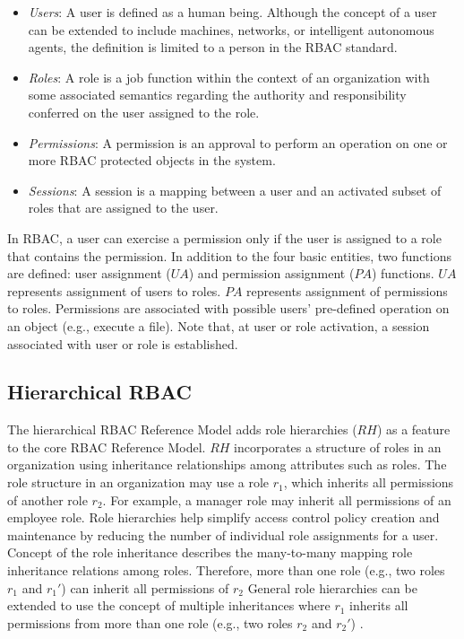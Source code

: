 \begin{itemize}
\setlength{\itemsep}{0.25pt}
\item \emph{Users}: A user is defined as a human being. Although the concept of a user can be extended to include machines, networks, or intelligent autonomous agents, the definition is limited to a person in the RBAC standard. 
\item \emph{Roles}: A role is a job function within the context of an organization with some associated semantics regarding the authority and responsibility conferred on the user assigned to the role.
\item \emph{Permissions}: A permission is an approval to perform an operation on one or more RBAC protected objects in the system.
\item \emph{Sessions}: A session is a mapping between a user and an activated subset of roles that are assigned to the user.
\end{itemize}

In RBAC, a user can exercise a permission only if the user is assigned to a role that contains the permission.
In addition to the four basic entities, two functions are defined:
user assignment ($UA$) and permission assignment ($PA$) functions.
$UA$ represents assignment of users to roles.
$PA$ represents assignment of permissions to roles.
Permissions are associated with possible users' pre-defined operation on an object (e.g., execute a file).
Note that, at user or role activation, a session associated with user or role is established.


\subsection{Hierarchical RBAC} 

The hierarchical RBAC Reference Model adds role hierarchies ($RH$) as a feature to the core RBAC Reference Model.
$RH$ incorporates a structure of roles in an organization using inheritance relationships among attributes such as roles.
The role structure in an organization may use
a role $r_1$, which inherits all permissions of another role $r_2$.
For example, a manager role may inherit all permissions of an employee role.
Role hierarchies help simplify access control policy creation and maintenance by reducing the number of
individual role assignments for a user. 
Concept of the role inheritance describes the many-to-many mapping role inheritance relations among roles.
Therefore, more than one role (e.g., two roles $r_1$ and $r_1'$) can inherit all permissions of $r_2$ 
General role hierarchies can be extended to use the concept of multiple inheritances where
$r_1$ inherits all permissions from more than one role (e.g., two roles $r_2$ and $r_2'$) .


